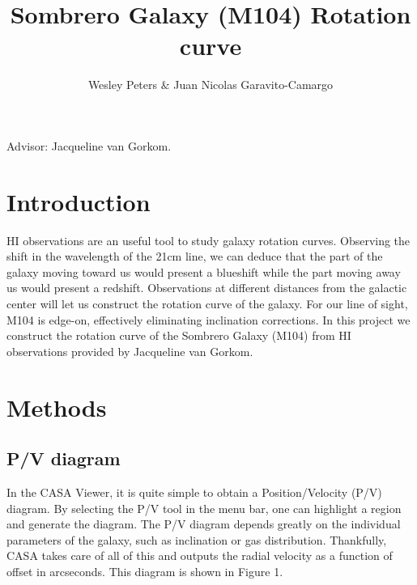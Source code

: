 \documentclass[12pt]{article}
\title{Sombrero Galaxy (M104) Rotation curve }
\begin{document}
\maketitle

\author{Wesley Peters $\&$ Juan Nicolas Garavito-Camargo}

Advisor: Jacqueline van Gorkom.

\section{Introduction}

HI observations are an useful tool to study galaxy rotation
curves. Observing  the shift in the wavelength of the 21cm line, we
can deduce that the part of the galaxy moving toward us would present
a blueshift while the part moving away us would present a
redshift. Observations at different distances from the galactic center
will let us construct the rotation curve of the galaxy. For our line of
sight, M104 is edge-on, effectively eliminating inclination
corrections. In this project we construct the rotation curve of the
Sombrero Galaxy (M104) from HI observations provided by Jacqueline van Gorkom.

\section{Methods}

\subsection{P/V diagram}

In the CASA Viewer, it is quite simple to obtain a Position/Velocity (P/V)
diagram. By selecting the P/V tool in the menu bar, one can highlight
a region and generate the diagram. The P/V diagram depends greatly on
the individual parameters of the galaxy, such as inclination or gas
distribution. Thankfully, CASA takes care of all of this and outputs
the radial velocity as a function of offset in arcseconds. This
diagram is shown in Figure 1. 
\end{document}
